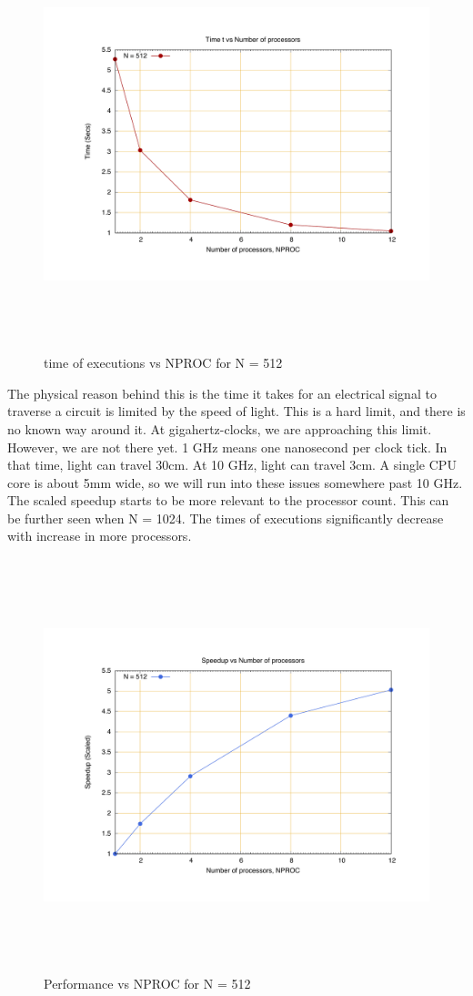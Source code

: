 \documentclass[fleqn,letterpaper,12pt]{report}
\begin{document}
\begin{figure}[htbp]
	\centering
	\includegraphics[height=120mm,width=160mm]{512.pdf}
	\caption{time of executions vs NPROC for N = 512\label{overflow}}
\end{figure}
The physical reason behind this is the time it takes for an electrical signal to traverse a circuit is limited by the speed of light. This is a hard limit, and there is no known way around it. At gigahertz-clocks, we are approaching this limit. However, we are not there yet. 1 GHz means one nanosecond per clock tick. In that time, light can travel 30cm. At 10 GHz, light can travel 3cm. A single CPU core is about 5mm wide, so we will run into these issues somewhere past 10 GHz.
\newpage
The scaled speedup starts to be more relevant to the processor count. This can be further seen when N = 1024. The times of executions significantly decrease with increase in more processors.
\begin{figure}[htbp]
	\centering
	\includegraphics[height=120mm,width=160mm]{512smat.pdf}
	\caption{Performance vs NPROC for N = 512\label{overflow}}
\end{figure}
\end{document}
